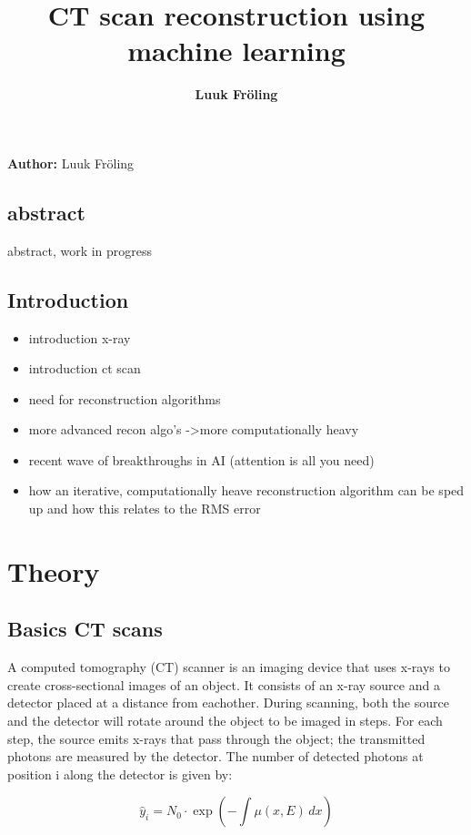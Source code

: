 \documentclass{article}
\title{CT scan reconstruction using machine learning}
\date{\displaydate{articleDate}}
\author{\bfseries Luuk Fröling\mdseries\\}
\begin{document}
\maketitle

\textbf{Author:} Luuk Fröling

\subsection{abstract}

abstract, work in progress

\subsection{Introduction}

\begin{itemize}
\item introduction x-ray
\item introduction ct scan
\item need for reconstruction algorithms
\item more advanced recon algo's -\textgreater  more computationally heavy
\item recent wave of breakthroughs in AI (attention is all you need)
\item how an iterative, computationally heave reconstruction algorithm can be sped up and how this relates to the RMS error
\end{itemize}

\section{Theory}

\subsection{Basics CT scans}

A computed tomography (CT) scanner is an imaging device that uses x-rays to create cross-sectional images of an object. It consists of an x-ray source and a detector placed at a distance from eachother. During scanning, both the source and the detector will rotate around the object to be imaged in steps. For each step, the source emits x-rays that pass through the object; the transmitted photons are measured by the detector. The number of detected photons at position i along the detector is given by:

\begin{equation}
\label{first }
\hat{y}_i  = N_0 \cdot \exp\left(-\int \mu(x, E) \, dx\right)
\end{equation}
\end{document}
